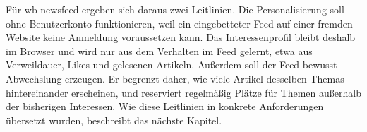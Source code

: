 Für wb-newsfeed ergeben sich daraus zwei Leitlinien.
Die Personalisierung soll ohne Benutzerkonto funktionieren, weil ein eingebetteter Feed auf einer fremden Website keine Anmeldung voraussetzen kann.
Das Interessenprofil bleibt deshalb im Browser und wird nur aus dem Verhalten im Feed gelernt, etwa aus Verweildauer, Likes und gelesenen Artikeln.
Außerdem soll der Feed bewusst Abwechslung erzeugen.
Er begrenzt daher, wie viele Artikel desselben Themas hintereinander erscheinen, und reserviert regelmäßig Plätze für Themen außerhalb der bisherigen Interessen.
Wie diese Leitlinien in konkrete Anforderungen übersetzt wurden, beschreibt das nächste Kapitel.
